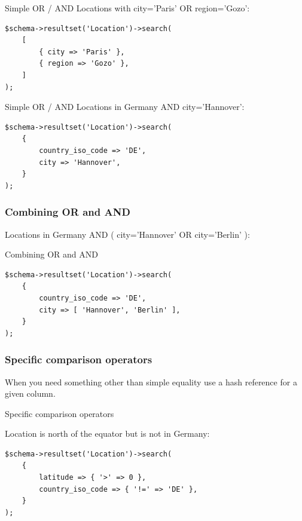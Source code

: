\begin{frame}[fragile]{Simple OR / AND}
Locations with city='Paris' OR region='Gozo':

\begin{lstlisting}
$schema->resultset('Location')->search(
    [
        { city => 'Paris' },
        { region => 'Gozo' },
    ]
);
\end{lstlisting}
\end{frame}

\begin{frame}[fragile]{Simple OR / AND}
Locations in Germany AND city='Hannover':

\begin{lstlisting}
$schema->resultset('Location')->search(
    {
        country_iso_code => 'DE',
        city => 'Hannover',
    }
);
\end{lstlisting}
\end{frame}

\subsubsection{Combining OR and AND}

Locations in Germany AND ( city='Hannover' OR city='Berlin' ):

\begin{frame}[fragile]{Combining OR and AND}

\begin{lstlisting}
$schema->resultset('Location')->search(
    {
        country_iso_code => 'DE',
        city => [ 'Hannover', 'Berlin' ],
    }
);
\end{lstlisting}
\end{frame}

\subsubsection{Specific comparison operators}

When you need something other than simple equality use a hash reference for a given column.

\begin{frame}[fragile]{Specific comparison operators}

Location is north of the equator but is not in Germany:

\begin{lstlisting}
$schema->resultset('Location')->search(
    {
        latitude => { '>' => 0 },
        country_iso_code => { '!=' => 'DE' },
    }
);
\end{lstlisting}
\end{frame}

